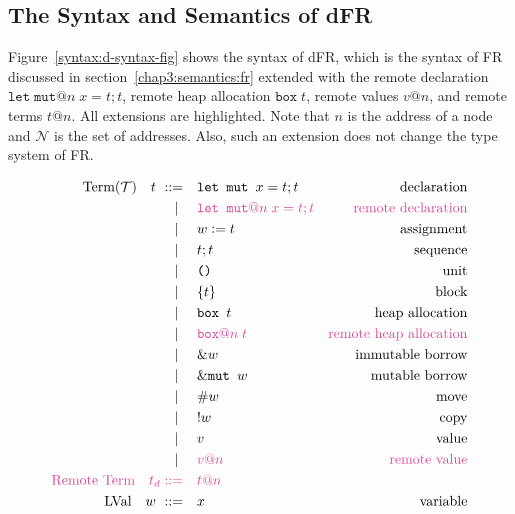 \subsection{The Syntax and Semantics of dFR} 
\label{chap3:semantics:dfr}
Figure~\ref{syntax:d-syntax-fig} shows the syntax of dFR, which is the syntax of FR discussed in section~\ref{chap3:semantics:fr} extended with the remote declaration $\texttt{let}\;\texttt{mut}@n\; x = t;t$, remote heap allocation $\texttt{box}\;t$, remote values $v@n$, and remote terms $t@n$. All extensions are highlighted. Note that $n$ is the address of a node and $\mathcal{N}$ is the set of addresses. Also, such an extension does not change the type system of FR.
\begin{figure}[!b]
\begin{alignat*}{3}
    \text{Term}(\mathcal{T}) \quad t \ \metaDeff \quad &\texttt{let mut } x = t;t &\text{declaration}\\
    \cmid \quad &\color{kirby}\texttt{let mut}@n\; x = t;t &\text{\color{kirby}remote declaration}\\
    \cmid \quad &w \metaDef t &\text{assignment}\\
    \cmid \quad &t;t &\text{sequence}\\
    \cmid \quad &\texttt{()} &\text{unit}\\
    \cmid \quad &\{t\} &\text{block}\\
    \cmid \quad &\texttt{box } t &\text{heap allocation}\\
    \cmid \quad &\color{kirby}\texttt{box}@n\; t &\text{\color{kirby}remote  heap allocation}\\
    \cmid \quad &\&w \quad &\text{immutable borrow} \\
    \cmid \quad &\&\texttt{mut } w \quad &\text{mutable borrow} \\
    \cmid \quad &\#{w} \quad &\text{move} \\
    \cmid \quad &!{w} \quad &\text{copy} \\
    \cmid \quad &v \quad &\text{value} \\
    \cmid \quad &\color{kirby}v@n \quad &\text{\color{kirby}remote value}\\
    \text{\color{kirby}Remote Term} \quad\color{kirby} t_d \metaDeff \quad &\color{kirby}t@n\\
    \text{LVal} \quad w \ \metaDeff \quad &x \quad &\text{variable} \\

\end{alignat*}
\end{figure}
